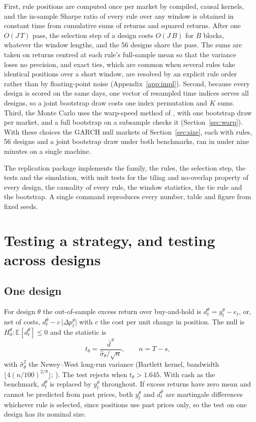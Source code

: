 \documentclass[pdflatex,sn-basic]{sn-jnl}
\theoremstyle{thmstyleone}
\theoremstyle{thmstylethree}
\newcommand{\E}{\mathbb{E}}
\begin{document}
First, rule positions are computed once per market by compiled, causal kernels, and the in-sample
Sharpe ratio of every rule over any window is obtained in constant time from cumulative sums of returns
and squared returns. After one $O(J\,T)$ pass, the selection step of a design costs $O(J\,B)$ for $B$
blocks, whatever the window lengths, and the 56 designs share the pass. The sums are taken on returns
centred at each rule's full-sample mean so that the variance loses no precision, and exact ties, which
are common when several rules take identical positions over a short window, are resolved by an
explicit rule order rather than by floating-point noise (Appendix~\ref{app:impl}). Second, because
every design is scored on the same days, one vector of resampled time indices serves all designs, so a
joint bootstrap draw costs one index permutation and $K$ sums. Third, the Monte Carlo uses the
warp-speed method of \citet{giacomini2013}, with one bootstrap draw per market, and a full bootstrap on
a subsample checks it (Section~\ref{sec:warp}). With these choices the \NumNullReps{} GARCH null
markets of Section~\ref{sec:size}, each with \NumRules{} rules, 56 designs and a joint bootstrap draw
under both benchmarks, ran in under nine minutes on a single machine.

The replication package implements the family, the rules, the selection step, the tests and the
simulation, with unit tests for the tiling and no-overlap property of every design, the causality of
every rule, the window statistics, the tie rule and the bootstrap. A single command reproduces every
number, table and figure from fixed seeds.

\section{Testing a strategy, and testing across designs}\label{sec:procedures}

\subsection{One design}\label{sec:onedesign}

For design $\theta$ the out-of-sample excess return over buy-and-hold is $d^{\theta}_t=y^{\theta}_t-e_t$,
or, net of costs, $d^{\theta}_t-c\,\lvert\Delta p^{\theta}_t\rvert$ with $c$ the cost per unit change in
position. The null is $H_0^{\theta}:\E[d^{\theta}_t]\le 0$ and the statistic is
\[
t_{\theta}=\frac{\bar d^{\,\theta}}{\hat\sigma_{\theta}/\sqrt{n}},\qquad n=T-s,
\]
with $\hat\sigma^2_{\theta}$ the Newey--West long-run variance (Bartlett kernel, bandwidth
$\lfloor 4(n/100)^{2/9}\rfloor$; \citealp{newey1987,newey1994}). The test rejects when $t_{\theta}>1.645$.
With cash as the benchmark, $d^{\theta}_t$ is replaced by $y^{\theta}_t$ throughout. If excess returns
have zero mean and cannot be predicted from past prices, both $y^{\theta}_t$ and $d^{\theta}_t$ are
martingale differences whichever rule is selected, since positions use past prices only, so the test
on one design has its nominal size.
\end{document}
